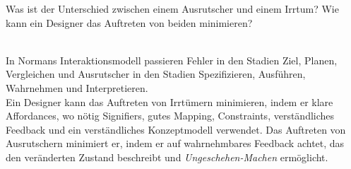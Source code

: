 \begin{exercise}
  Was ist der Unterschied zwischen einem Ausrutscher und einem Irrtum? 
  Wie kann ein Designer das Auftreten von beiden minimieren?
  \\\\
\end{exercise}
In Normans Interaktionsmodell passieren Fehler in den Stadien Ziel,
Planen, Vergleichen und Ausrutscher in den Stadien Spezifizieren, Ausführen, Wahrnehmen und Interpretieren.\\
Ein Designer kann das Auftreten von Irrtümern minimieren, indem er klare Affordances, wo nötig Signifiers, gutes Mapping, Constraints, verständliches Feedback und ein verständliches Konzeptmodell verwendet.
Das Auftreten von Ausrutschern minimiert er, indem er auf wahrnehmbares Feedback achtet, das den veränderten Zustand beschreibt und \textit{Ungeschehen-Machen} ermöglicht.